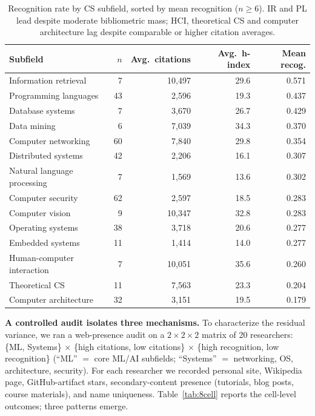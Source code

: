 \documentclass[11pt]{article}
\begin{document}
\begin{table}[H]
\centering
\small
\caption{Recognition rate by CS subfield, sorted by mean recognition ($n \geq 6$). IR and PL lead despite moderate bibliometric mass; HCI, theoretical CS and computer architecture lag despite comparable or higher citation averages.}
\label{tab:recog-by-field}
\begin{tabular}{lrrrr}
\toprule
Subfield & $n$ & Avg.\ citations & Avg.\ h-index & Mean recog. \\
\midrule
Information retrieval         & 7  & 10{,}497 & 29.6 & 0.571 \\
Programming languages         & 43 & 2{,}596  & 19.3 & 0.437 \\
Database systems              & 7  & 3{,}670  & 26.7 & 0.429 \\
Data mining                   & 6  & 7{,}039  & 34.3 & 0.370 \\
Computer networking           & 60 & 7{,}840  & 29.8 & 0.354 \\
Distributed systems           & 42 & 2{,}206  & 16.1 & 0.307 \\
Natural language processing   & 7  & 1{,}569  & 13.6 & 0.302 \\
Computer security             & 62 & 2{,}597  & 18.5 & 0.283 \\
Computer vision               & 9  & 10{,}347 & 32.8 & 0.283 \\
Operating systems             & 38 & 3{,}718  & 20.6 & 0.277 \\
Embedded systems              & 11 & 1{,}414  & 14.0 & 0.277 \\
Human-computer interaction    & 7  & 10{,}051 & 35.6 & 0.260 \\
Theoretical CS                & 11 & 7{,}563  & 23.3 & 0.204 \\
Computer architecture         & 32 & 3{,}151  & 19.5 & 0.179 \\
\bottomrule
\end{tabular}
\end{table}

\textbf{A controlled audit isolates three mechanisms.} To characterize the residual variance, we ran a web-presence audit on a $2\times2\times2$ matrix of 20 researchers: \{ML, Systems\} $\times$ \{high citations, low citations\} $\times$ \{high recognition, low recognition\} (``ML'' $=$ core ML/AI subfields; ``Systems'' $=$ networking, OS, architecture, security). For each researcher we recorded personal site, Wikipedia page, GitHub-artifact stars, secondary-content presence (tutorials, blog posts, course materials), and name uniqueness. Table~\ref{tab:8cell} reports the cell-level outcomes; three patterns emerge.
\end{document}
